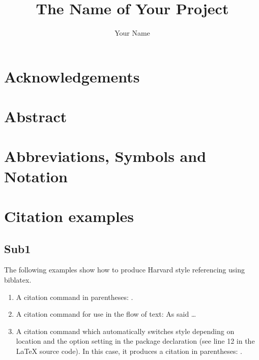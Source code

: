 \documentclass[a4paper, 12pt]{article}
\title{The Name of Your Project}
\author{Your Name}
\institute{Name of Your University}
\begin{document}
	
\addtitlepage
\pagebreak


\tableofcontents
\pagebreak

\listoffigures
\pagebreak

\listoftables
\pagebreak



\section{Acknowledgements}


\pagebreak


\section{Abstract}


\pagebreak


\section{Abbreviations, Symbols and Notation}


\pagebreak


\section{Citation examples}
\subsection{Sub1}



The following examples show how to produce Harvard style referencing using biblatex.

\begin{enumerate}
\item A citation command in parentheses: \parencite{Smith:2012qr}.
\item A citation command for use in the flow of text: As \textcite{Smith:2013jd} said \dots
\item A citation command which automatically switches style depending on location and the option setting in the package declaration (see line 12 in the LaTeX source code). In this case, it produces a citation in parentheses: \autocite{Other:2014ab}.
\end{enumerate}
\end{document}

